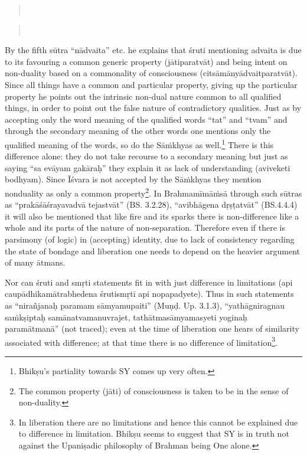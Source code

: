 \begin{verse}
\\
\end{verse}
\begin{verse}
\\
\end{verse}


By the fifth sūtra “nādvaita” etc. he explains that śruti mentioning advaita is due to its favouring a common generic property (jātiparatvāt) and being intent on non-duality based on a commonality of consciousness (citsāmānyādvaitparatvāt). Since all things have a common and particular property, giving up the particular property he points out the intrinsic non-dual nature common to all qualified things, in order to point out the false nature of contradictory qualities. Just as by accepting only the word meaning of the qualified words   “tat” and “tvam” and through the  secondary meaning of the other words one mentions only the qualified meaning of the words, so do the Sāṁkhyas as well.\footnote{Bhikṣu’s partiality towards SY comes up very often.} There is this difference alone: they do not take recourse to a secondary meaning but just as saying “sa evāyam gakāraḥ” they explain it as lack of understanding (aviveketi bodhyam). Since Īśvara is not accepted by the Sāṁkhyas they mention nonduality as only a common property\footnote{The common property (jāti) of consciousness is taken to be in the sense of non-duality.}. In Brahmamīmāṁsā through such sūtras as “prakāśāśrayavadvā tejastvāt” (BS. 3.2.28), “avibhāgena dṛṣṭatvāt” (BS.4.4.4) it will also be mentioned that like fire and its sparks there is non-difference like a whole and its parts of the nature of non-separation. Therefore even if there is parsimony (of logic) in  (accepting) identity, due to lack of consistency regarding the state of bondage and liberation one needs to depend on the heavier argument of many ātmans. 

Nor can śruti and smṛti statements fit in with just difference in limitations (api caupādhikamātrabhedena śrutismṛtī api nopapadyete). Thus in such statements as “nirañjanaḥ paramam sāmyamupaiti” (Muṇḍ. Up. 3.1.3), “yathāgniragnau saṁkṣiptaḥ samānatvamanuvrajet, tathātmasāmyamasyeti yoginaḥ paramātmanā” (not traced); even at the time of liberation one hears of similarity associated with difference; at that time there is no difference of limitation\footnote{In liberation there are no limitations and hence this cannot be explained due to difference in limitation. Bhikṣu seems to suggest that SY is in truth not against the Upaniṣadic philosophy of Brahman being One alone.}. 

